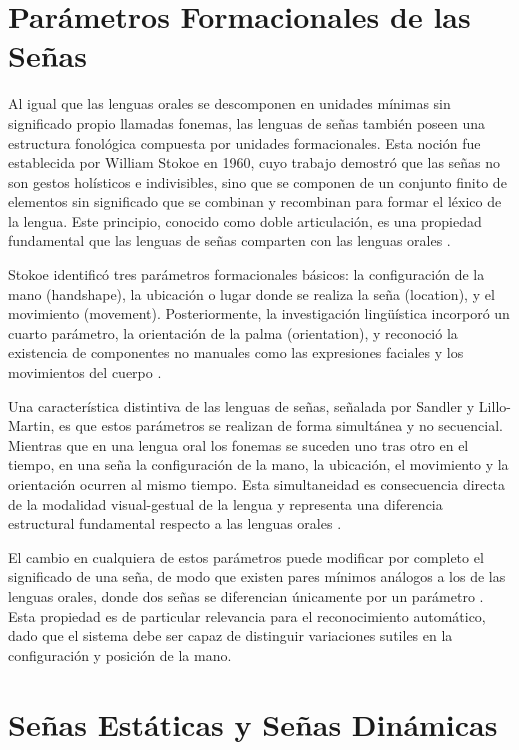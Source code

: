 \section{Parámetros Formacionales de las Señas}

Al igual que las lenguas orales se descomponen en unidades mínimas sin significado propio
llamadas fonemas, las lenguas de señas también poseen una estructura fonológica
compuesta por unidades formacionales. Esta noción fue establecida por William Stokoe en
1960, cuyo trabajo demostró que las señas no son gestos holísticos e indivisibles, sino que
se componen de un conjunto finito de elementos sin significado que se combinan y
recombinan para formar el léxico de la lengua. Este principio, conocido como doble
articulación, es una propiedad fundamental que las lenguas de señas comparten con las
lenguas orales \cite{stokoe_structure_1960}.

Stokoe identificó tres parámetros formacionales básicos: la configuración de la mano
(handshape), la ubicación o lugar donde se realiza la seña (location), y el movimiento
(movement). Posteriormente, la investigación lingüística incorporó un cuarto parámetro,
la orientación de la palma (orientation), y reconoció la existencia de componentes no
manuales como las expresiones faciales y los movimientos del cuerpo \cite{sandler_universals_2006}.

Una característica distintiva de las lenguas de señas, señalada por Sandler y Lillo-Martin,
es que estos parámetros se realizan de forma simultánea y no secuencial. Mientras que en
una lengua oral los fonemas se suceden uno tras otro en el tiempo, en una seña la
configuración de la mano, la ubicación, el movimiento y la orientación ocurren al mismo
tiempo. Esta simultaneidad es consecuencia directa de la modalidad visual-gestual de la
lengua y representa una diferencia estructural fundamental respecto a las lenguas orales \cite{sandler_universals_2006}.

El cambio en cualquiera de estos parámetros puede modificar por completo el significado de
una seña, de modo que existen pares mínimos análogos a los de las lenguas orales, donde
dos señas se diferencian únicamente por un parámetro \cite{sandler_universals_2006}. Esta propiedad es de particular
relevancia para el reconocimiento automático, dado que el sistema debe ser capaz de
distinguir variaciones sutiles en la configuración y posición de la mano.

\section{Señas Estáticas y Señas Dinámicas}

